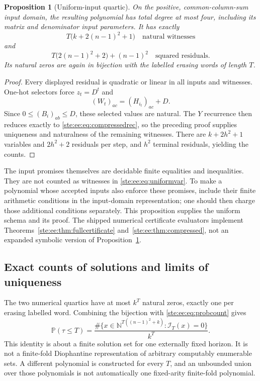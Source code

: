 \documentclass[11pt,letterpaper]{article}
\newtheorem{proposition}[theorem]{Proposition}
\theoremstyle{definition}
\theoremstyle{remark}
\newcommand{\N}{\mathbb N}
\newcommand{\PP}{\mathbb P}
\begin{document}
\begin{proposition}[Uniform-input quartic]\label{ste:ee:prop:uniformquartic}
On the positive, common-column-sum input domain, the resulting polynomial has
total degree at most four, \emph{including its matrix and denominator input
parameters}. It has exactly
\begin{equation}
 T\bigl(k+2(n-1)^2+1\bigr)\quad\text{natural witnesses}
 \label{ste:ee:eq:uniformvar}
\end{equation}
and
\begin{equation}
 T\bigl(2(n-1)^2+2\bigr)+(n-1)^2\quad\text{squared residuals}.
 \label{ste:ee:eq:uniformres}
\end{equation}
Its natural zeros are again in bijection with the labelled erasing words of
length $T$.
\end{proposition}
\begin{proof}
Every displayed residual is quadratic or linear in all inputs and witnesses.
One-hot selectors force $z_t=D^t$ and
\[
 (W_t)_{ac}=(H_{i_t})_{ac}+D.
\]
Since $0\leq(B_i)_{ab}\leq D$, these selected values are natural. The $Y$
recurrence then reduces exactly to \eqref{ste:ee:eq:compressedrec}, so the preceding
proof supplies uniqueness and naturalness of the remaining witnesses.
There are $k+2h^2+1$ variables and $2h^2+2$ residuals per step, and $h^2$ terminal
residuals, yielding the counts.
\end{proof}

The input promises themselves are decidable finite equalities and inequalities.
They are not counted as witnesses in \eqref{ste:ee:eq:uniformvar}. To make a polynomial
whose accepted inputs also enforce these promises, include their finite
arithmetic conditions in the input-domain representation; one should then
charge those additional conditions separately. This proposition supplies the
uniform schema and its proof. The shipped numerical certificate evaluators
implement Theorems~\ref{ste:ee:thm:fullcertificate} and~\ref{ste:ee:thm:compressed}, not an
expanded symbolic version of Proposition~\ref{ste:ee:prop:uniformquartic}.

\subsection{Exact counts of solutions and limits of uniqueness}

The two numerical quartics have at most $k^T$ natural zeros, exactly one per
erasing labelled word. Combining the bijection with \eqref{ste:ee:eq:probcount} gives
\begin{equation}
 \PP(\tau\leq T)=\frac{\#\{x\in\N^{T((n-1)^2+k)}:\mathcal I_T(x)=0\}}{k^T}.
 \label{ste:ee:eq:quarticprobability}
\end{equation}
This identity is about a finite solution set for one externally fixed horizon.
It is not a finite-fold Diophantine representation of arbitrary computably
enumerable sets. A different polynomial is constructed for every $T$, and an
unbounded union over those polynomials is not automatically one fixed-arity
finite-fold polynomial.
\end{document}
